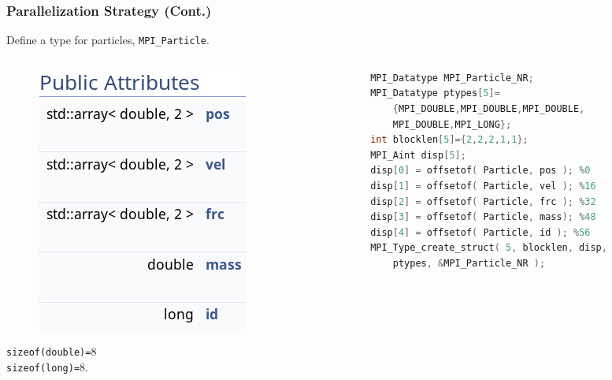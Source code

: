 \begin{frame}[fragile]
\frametitle{Parallelization Strategy (Cont.)}
Define a type for particles, \lstinline|MPI_Particle|.\vspace*{10pt}
	\begin{columns}
		\begin{column}{0.4\textwidth}
			\begin{figure}
				\centering
				\includegraphics[width=\textwidth]{inclfigs/particle.png}
			\end{figure}
			\lstinline|sizeof(double)=|\SI{8}{\byte}\\\lstinline|sizeof(long)=|\SI{8}{\byte}.
		\end{column}
		\begin{column}{0.6\textwidth}
\begin{lstlisting}[language=C++,basicstyle=\scriptsize]
MPI_Datatype MPI_Particle_NR;
MPI_Datatype ptypes[5]=
    {MPI_DOUBLE,MPI_DOUBLE,MPI_DOUBLE,
    MPI_DOUBLE,MPI_LONG};
int blocklen[5]={2,2,2,1,1};
MPI_Aint disp[5];
disp[0] = offsetof( Particle, pos ); %0
disp[1] = offsetof( Particle, vel ); %16
disp[2] = offsetof( Particle, frc ); %32
disp[3] = offsetof( Particle, mass); %48
disp[4] = offsetof( Particle, id ); %56
MPI_Type_create_struct( 5, blocklen, disp,
    ptypes, &MPI_Particle_NR );
\end{lstlisting}
	\end{column}
	\end{columns}
\end{frame}